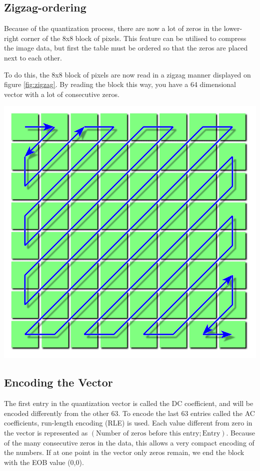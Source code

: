 \begin{infobox}
\vspace{4mm}
\subsection{Zigzag-ordering} 
\vspace{-2.5mm}
Because of the quantization process, there are now a lot of zeros in the lower-right corner of the 8x8 block of pixels.
This feature can be utilised to compress the image data, but first the table must be ordered so that the zeros are placed next to each other. 

To do this, the 8x8 block of pixels are now read in a zigzag manner displayed on figure \ref{fig:zigzag}.
By reading the block this way, you have a 64 dimensional vector with a lot of consecutive zeros. 

\begin{centering}
\includegraphics[width=.5\textwidth]{figures/zigzagordering.png}
\label{fig:zigzag}
\end{centering} 

\vspace{4mm}
\subsection{Encoding the Vector}
\vspace{-2.5mm}
The first entry in the quantization vector is called the DC coefficient, and will be encoded differently from the other 63.
To encode the last 63 entries called the AC coefficients, run-length encoding (RLE) is used.
Each value different from zero in the vector is represented as $(\text{Number of zeros before this entry}; \text{Entry})$.
Because of the many consecutive zeros in the data, this allows a very compact encoding of the numbers.
If at one point in the vector only zeros remain, we end the block with the EOB value (0,0). 


\end{infobox}
